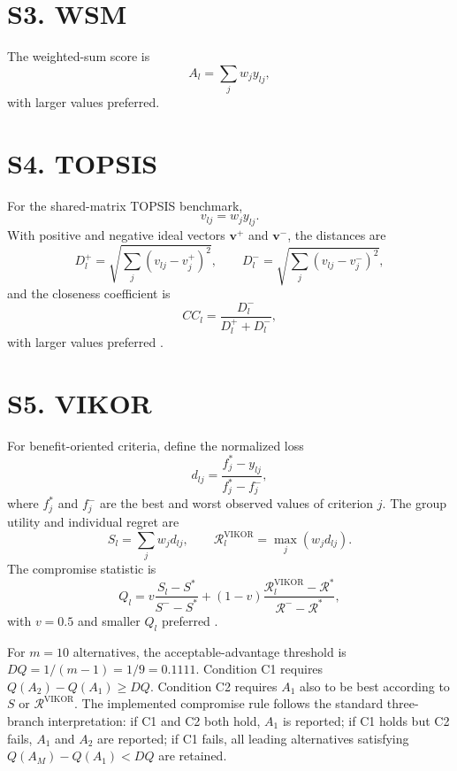 \documentclass[11pt]{article}
\begin{document}
\section*{S3. WSM}
The weighted-sum score is
\begin{equation}
A_l=\sum_j w_j y_{lj},
\end{equation}
with larger values preferred.

\section*{S4. TOPSIS}
For the shared-matrix TOPSIS benchmark,
\begin{equation}
v_{lj}=w_jy_{lj}.
\end{equation}
With positive and negative ideal vectors $\mathbf{v}^+$ and $\mathbf{v}^-$, the distances are
\begin{equation}
D_l^+=\sqrt{\sum_j (v_{lj}-v_j^+)^2},\qquad
D_l^-=\sqrt{\sum_j (v_{lj}-v_j^-)^2},
\end{equation}
and the closeness coefficient is
\begin{equation}
CC_l=\frac{D_l^-}{D_l^+ + D_l^-},
\end{equation}
with larger values preferred \cite{hwang1981}.

\section*{S5. VIKOR}
For benefit-oriented criteria, define the normalized loss
\begin{equation}
d_{lj}=\frac{f_j^*-y_{lj}}{f_j^*-f_j^-},
\end{equation}
where $f_j^*$ and $f_j^-$ are the best and worst observed values of criterion $j$. The group utility and individual regret are
\begin{equation}
S_l=\sum_j w_jd_{lj},\qquad
\mathcal{R}^{\mathrm{VIKOR}}_l=\max_j(w_jd_{lj}).
\end{equation}
The compromise statistic is
\begin{equation}
Q_l=v\frac{S_l-S^*}{S^- -S^*}+(1-v)
\frac{\mathcal{R}^{\mathrm{VIKOR}}_l-\mathcal{R}^*}{\mathcal{R}^- -\mathcal{R}^*},
\end{equation}
with $v=0.5$ and smaller $Q_l$ preferred \cite{opricovic2004}.

For $m=10$ alternatives, the acceptable-advantage threshold is $DQ=1/(m-1)=1/9=0.1111$. Condition C1 requires $Q(A_2)-Q(A_1)\ge DQ$. Condition C2 requires $A_1$ also to be best according to $S$ or $\mathcal{R}^{\mathrm{VIKOR}}$. The implemented compromise rule follows the standard three-branch interpretation: if C1 and C2 both hold, $A_1$ is reported; if C1 holds but C2 fails, $A_1$ and $A_2$ are reported; if C1 fails, all leading alternatives satisfying $Q(A_M)-Q(A_1)<DQ$ are retained.
\end{document}
